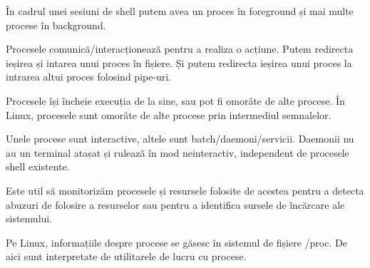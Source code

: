 În cadrul unei sesiuni de shell putem avea un proces în foreground și mai multe
procese în background.

Procesele comunică/interacționează pentru a realiza o acțiune. Putem redirecta
ieșirea și intarea unui proces în fișiere. Și putem redirecta ieșirea unui
proces la intrarea altui proces folosind pipe-uri.

Procesele își încheie execuția de la sine, sau pot fi omorâte de alte procese.
În Linux, procesele sunt omorâte de alte procese prin intermediul semnalelor.

Unele procese sunt interactive, altele sunt batch/daemoni/servicii. Daemonii nu
au un terminal atașat și rulează în mod neinteractiv, independent de procesele
shell existente.

Este util să monitorizăm procesele și resursele folosite de acestea pentru a
detecta abuzuri de folosire a resurselor sau pentru a identifica sursele de
încărcare ale sistemului.

Pe Linux, informațiile despre procese se găsesc în sistemul de fișiere /proc. De
aici sunt interpretate de utilitarele de lucru cu procese.
